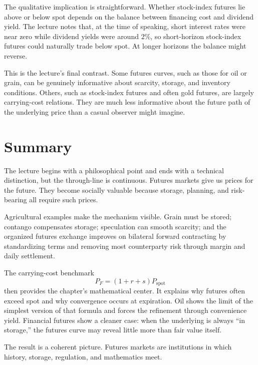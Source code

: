 The qualitative implication is straightforward. Whether stock-index futures lie above or below spot depends on the balance between financing cost and dividend yield. The lecture notes that, at the time of speaking, short interest rates were near zero while dividend yields were around $2\%$, so short-horizon stock-index futures could naturally trade below spot. At longer horizons the balance might reverse.

This is the lecture's final contrast. Some futures curves, such as those for oil or grain, can be genuinely informative about scarcity, storage, and inventory conditions. Others, such as stock-index futures and often gold futures, are largely carrying-cost relations. They are much less informative about the future path of the underlying price than a casual observer might imagine.

\section{Summary}

The lecture begins with a philosophical point and ends with a technical distinction, but the through-line is continuous. Futures markets give us prices for the future. They become socially valuable because storage, planning, and risk-bearing all require such prices.

Agricultural examples make the mechanism visible. Grain must be stored; contango compensates storage; speculation can smooth scarcity; and the organized futures exchange improves on bilateral forward contracting by standardizing terms and removing most counterparty risk through margin and daily settlement.

The carrying-cost benchmark
\[
P_F=(1+r+s)P_{\text{spot}}
\]
then provides the chapter's mathematical center. It explains why futures often exceed spot and why convergence occurs at expiration. Oil shows the limit of the simplest version of that formula and forces the refinement through convenience yield. Financial futures show a cleaner case: when the underlying is always ``in storage,'' the futures curve may reveal little more than fair value itself.

The result is a coherent picture. Futures markets are institutions in which history, storage, regulation, and mathematics meet.